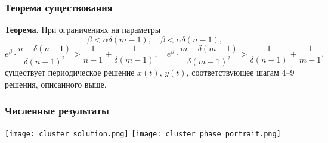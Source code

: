 \begin{frame}
	\frametitle{Теорема существования}
	\textbf{Теорема.} При ограничениях на параметры 
	\small
	\begin{equation*}
		\label{eq:constraint_2}
		\beta < \alpha \delta (m - 1), \quad \beta < \alpha \delta (n - 1),
	\end{equation*}
	\begin{equation*}
		\label{eq:constraint_3}
		e^{\beta} \cdot \dfrac{n - \delta(n - 1)}{\delta (n - 1)^2} > \dfrac{1}{n - 1} + \dfrac{1}{\delta(m - 1)}, \quad
		e^{\beta} \cdot \dfrac{m - \delta(m - 1)}{\delta (m - 1)^2} > \dfrac{1}{\delta(n - 1)} + \dfrac{1}{m - 1}.
	\end{equation*}
	\normalsize
	существует периодическое решение $x(t)$, $y(t)$, соответствующее шагам 4--9 решения, описанного выше.
	
\end{frame}


\begin{frame}
	\frametitle{Численные результаты}
	\texttt{[image: cluster\_solution.png]}
	\hfill
	\texttt{[image: cluster\_phase\_portrait.png]}
\end{frame}
